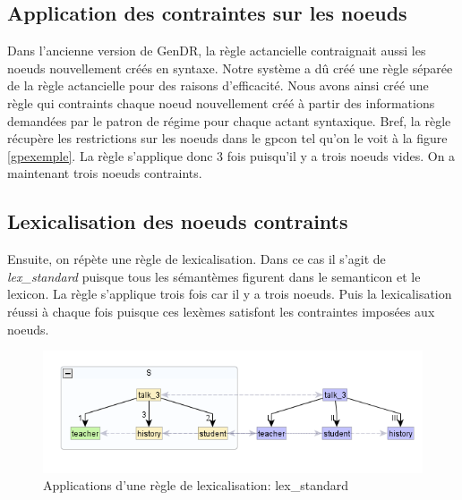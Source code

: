 \subsection{Application des contraintes sur les noeuds}
Dans l'ancienne version de GenDR, la règle actancielle contraignait aussi les noeuds nouvellement créés en syntaxe. Notre système a dû créé une règle séparée de la règle actancielle pour des raisons d'efficacité. Nous avons ainsi créé une règle qui contraints chaque noeud nouvellement créé à partir des informations demandées par le patron de régime pour chaque actant syntaxique. Bref, la règle récupère les restrictions sur les noeuds dans le gpcon tel qu'on le voit à la figure \ref{gpexemple}. La règle s'applique donc 3 fois puisqu'il y a trois noeuds vides. On a maintenant trois noeuds contraints.

\subsection{Lexicalisation des noeuds contraints}
Ensuite, on répète une règle de lexicalisation. Dans ce cas il s'agit de \emph{lex\_standard} puisque tous les sémantèmes figurent dans le semanticon et le lexicon. La règle s'applique trois fois car il y a trois noeuds. Puis la lexicalisation réussi à chaque fois puisque ces lexèmes satisfont les contraintes imposées aux noeuds.
\begin{figure}[htb]
	\centering
	\includegraphics[width=1\textwidth, trim = {0cm 0cm 0cm 0cm},clip]{ch6/figs/lex.png}
	\caption{Applications d'une règle de lexicalisation: lex\_standard}
	\label{deroulement3}
\end{figure}

